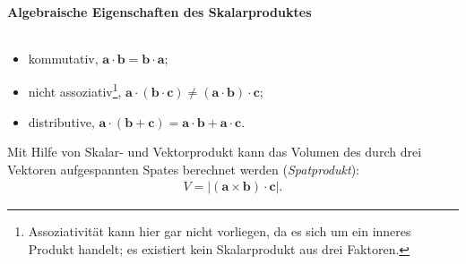 \paragraph{Algebraische Eigenschaften des Skalarproduktes}$~$

\begin{itemize}
    \item kommutativ, $\bm{a}\cdot \bm{b} = \bm{b}\cdot\bm{a}$; 
    \item nicht assoziativ\footnote{Assoziativität kann hier gar nicht vorliegen, da es sich um ein inneres Produkt handelt; es existiert kein Skalarprodukt aus drei Faktoren.}, $\bm{a}\cdot (\bm{b}\cdot\bm{c}) \neq (\bm{a}\cdot\bm{b})\cdot\bm{c}$;
    \item distributive, $\bm{a}\cdot (\bm{b}+\bm{c}) = \bm{a}\cdot\bm{b}+\bm{a}\cdot\bm{c}$.
\end{itemize}
Mit Hilfe von Skalar- und Vektorprodukt kann das Volumen des durch drei Vektoren aufgespannten Spates berechnet werden (\emph{Spatprodukt}): 
\begin{align}
    V = |(\bm{a}\times\bm{b}) \cdot\bm{c}|.
\end{align}